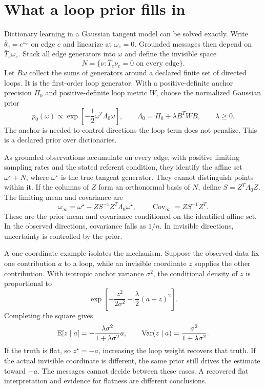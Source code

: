\section{What a loop prior fills in}

Dictionary learning in a Gaussian tangent model can be solved exactly. Write $\bar\theta_e=e^{\omega_e}$ on edge $e$ and linearize at $\omega_e=0$. Grounded messages then depend on $\bar T_e\omega_e$. Stack all edge generators into $\omega$ and define the invisible space
\begin{equation}
N=\{\nu:\bar T_e\nu_e=0\text{ on every edge}\}.
\end{equation}
Let $B\omega$ collect the sums of generators around a declared finite set of directed loops. It is the first-order loop generator. With a positive-definite anchor precision $\Pi_0$ and positive-definite loop metric $W$, choose the normalized Gaussian prior
\begin{equation}
p_0(\omega)\propto
\exp\left[-\frac12\omega^T\Lambda_0\omega\right],
\qquad
\Lambda_0=\Pi_0+\lambda B^TWB,\qquad\lambda\geq0.
\label{c17:loop-prior}
\end{equation}
The anchor is needed to control directions the loop term does not penalize. This is a declared prior over dictionaries.

As grounded observations accumulate on every edge, with positive limiting sampling rates and the stated referent condition, they identify the affine set $\omega^\star+N$, where $\omega^\star$ is the true tangent generator. They cannot distinguish points within it. If the columns of $Z$ form an orthonormal basis of $N$, define $S=Z^T\Lambda_0Z$. The limiting mean and covariance are
\begin{equation}
\omega_\infty
=\omega^\star-ZS^{-1}Z^T\Lambda_0\omega^\star,\qquad
\operatorname{Cov}_\infty=ZS^{-1}Z^T.
\label{c17:limit}
\end{equation}
These are the prior mean and covariance conditioned on the identified affine set. In the observed directions, covariance falls as $1/n$. In invisible directions, uncertainty is controlled by the prior.

A one-coordinate example isolates the mechanism. Suppose the observed data fix one contribution $a$ to a loop, while an invisible coordinate $z$ supplies the other contribution. With isotropic anchor variance $\sigma^2$, the conditional density of $z$ is proportional to
\begin{equation}
\exp\left[-\frac{z^2}{2\sigma^2}
-\frac{\lambda}{2}(a+z)^2\right].
\end{equation}
Completing the square gives
\begin{equation}
\mathbb E[z\mid a]=-\frac{\lambda\sigma^2}{1+\lambda\sigma^2}a,\qquad
\operatorname{Var}(z\mid a)=\frac{\sigma^2}{1+\lambda\sigma^2}.
\label{c17:completion-example}
\end{equation}
If the truth is flat, so $z^\star=-a$, increasing the loop weight recovers that truth. If the actual invisible coordinate is different, the same prior still drives the estimate toward $-a$. The messages cannot decide between these cases. A recovered flat interpretation and evidence for flatness are different conclusions.

